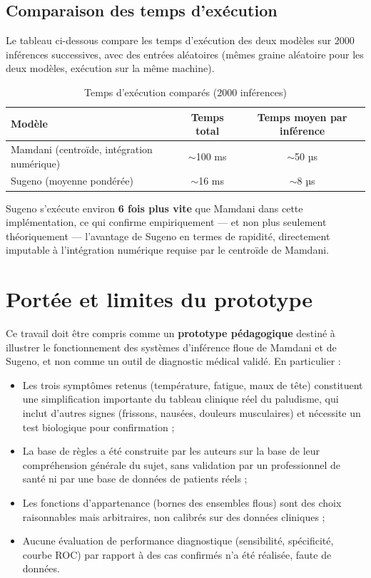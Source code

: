 \documentclass[a4paper,12pt]{report} %
\begin{document}
\subsection{Comparaison des temps d'exécution}
\label{subsec:temps-execution}

Le tableau ci-dessous compare les temps d'exécution des deux modèles sur 2000 inférences successives, avec des entrées aléatoires (mêmes graine aléatoire pour les deux modèles, exécution sur la même machine).

\begin{table}[H]
\centering
\caption{Temps d'exécution comparés (2000 inférences)}
\begin{tabular}{|l|c|c|}
\hline
\textbf{Modèle} & \textbf{Temps total} & \textbf{Temps moyen par inférence} \\
\hline
Mamdani (centroïde, intégration numérique) & $\sim$100 ms & $\sim$50 µs \\
Sugeno (moyenne pondérée) & $\sim$16 ms & $\sim$8 µs \\
\hline
\end{tabular}
\end{table}

Sugeno s'exécute environ \textbf{6 fois plus vite} que Mamdani dans cette implémentation, ce qui confirme empiriquement — et non plus seulement théoriquement — l'avantage de Sugeno en termes de rapidité, directement imputable à l'intégration numérique requise par le centroïde de Mamdani.

\section{Portée et limites du prototype}
\label{sec:limites-portee}

Ce travail doit être compris comme un \textbf{prototype pédagogique} destiné à illustrer le fonctionnement des systèmes d'inférence floue de Mamdani et de Sugeno, et non comme un outil de diagnostic médical validé. En particulier :

\begin{itemize}
\item Les trois symptômes retenus (température, fatigue, maux de tête) constituent une simplification importante du tableau clinique réel du paludisme, qui inclut d'autres signes (frissons, nausées, douleurs musculaires) et nécessite un test biologique pour confirmation ;
\item La base de règles a été construite par les auteurs sur la base de leur compréhension générale du sujet, sans validation par un professionnel de santé ni par une base de données de patients réels ;
\item Les fonctions d'appartenance (bornes des ensembles flous) sont des choix raisonnables mais arbitraires, non calibrés sur des données cliniques ;
\item Aucune évaluation de performance diagnostique (sensibilité, spécificité, courbe ROC) par rapport à des cas confirmés n'a été réalisée, faute de données.
\end{itemize}
\end{document}
